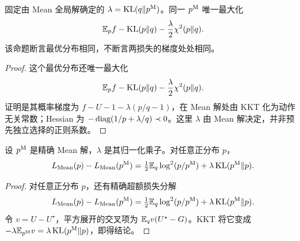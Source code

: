 \begin{proposition}
固定由 Mean 全局解确定的 $\lambda=\operatorname{KL}(q\Vert p^{\rm M})$。同一 $p^{\rm M}$ 唯一最大化
\begin{equation}
\mathbb E_pf-\operatorname{KL}(p\Vert q)-\frac{\lambda}{2}\chi^2(p\Vert q).
\end{equation}
该命题断言最优分布相同，不断言两损失的梯度处处相同。
\end{proposition}
\begin{proof}
这个最优分布还唯一最大化
\begin{equation}
\mathbb E_pf-\operatorname{KL}(p\Vert q)-\frac{\lambda}{2}\chi^2(p\Vert q).
\label{eq:mean-mixed}
\end{equation}
证明是其概率梯度为 $f-U-1-\lambda(p/q-1)$，在 Mean 解处由 KKT 化为动作无关常数；Hessian 为 $-\operatorname{diag}(1/p+\lambda/q)\prec0$。这里 $\lambda$ 由 Mean 解决定，并非预先独立选择的正则系数。
\end{proof}

\begin{proposition}
设 $p^{\rm M}$ 是精确 Mean 解，$\lambda$ 是其归一化乘子。对任意正分布 $p$，
\begin{equation}
L_{\rm Mean}(p)-L_{\rm Mean}(p^{\rm M})
=\tfrac12\mathbb E_q\log^2(p/p^{\rm M})+\lambda\operatorname{KL}(p^{\rm M}\Vert p).
\end{equation}
\end{proposition}
\begin{proof}
对任意正分布 $p$，还有精确超额损失分解
\begin{equation}
L_{\rm Mean}(p)-L_{\rm Mean}(p^{\rm M})
=\tfrac12\mathbb E_q\log^2(p/p^{\rm M})+\lambda\operatorname{KL}(p^{\rm M}\Vert p).
\label{eq:mean-excess}
\end{equation}
令 $v=U-U^\star$，平方展开的交叉项为 $\mathbb E_qv(U^\star-G)$。KKT 将它变成 $-\lambda\mathbb E_{p^{\rm M}}v=\lambda\operatorname{KL}(p^{\rm M}\Vert p)$，即得结论。
\end{proof}

